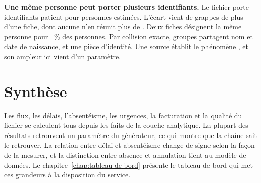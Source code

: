 \textbf{Une même personne peut porter plusieurs identifiants.} Le fichier porte
 identifiants patient pour  personnes
estimées. L'écart vient de  grappes de plus d'une fiche, dont aucune n'en
réunit plus de . Deux fiches désignent la même personne pour
~\% des personnes. Par collision exacte,
 groupes partagent nom et date de naissance, et
 une pièce d'identité. Une source établit le phénomène \cite{s20},
et son ampleur ici vient d'un paramètre.

\enlargethispage{50pt}
\section*{Synthèse}

Les flux, les délais, l'absentéisme, les urgences, la facturation et la qualité du fichier se
calculent tous depuis les faits de la couche analytique. La plupart des résultats retrouvent un
paramètre du générateur, ce qui montre que la chaîne sait le retrouver. La relation entre délai et
absentéisme change de signe selon la façon de la mesurer, et la distinction entre absence et
annulation tient au modèle de données. Le chapitre~\ref{chap:tableau-de-bord} présente le tableau de
bord qui met ces grandeurs à la disposition du service.
